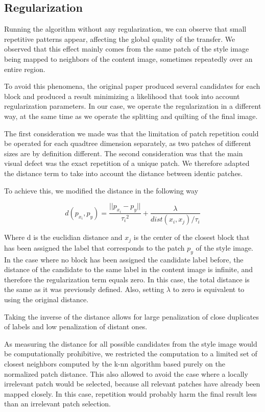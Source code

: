\documentclass[a4paper]{article}
\begin{document}
\subsection{Regularization}

Running the algorithm without any regularization, we can observe that small repetitive patterns appear, affecting the global quality of the transfer. We observed that this effect mainly comes from the same patch of the style image being mapped to neighbors of the content image, sometimes repeatedly over an entire region.

To avoid this phenomena, the original paper produced several candidates for each block and produced a result minimizing a likelihood that took into account regularization parameters. In our case, we operate the regularization in a different way, at the same time as we operate the splitting and quilting of the final image.

The first consideration we made was that the limitation of patch repetition could be operated for each quadtree dimension separately, as two patches of different sizes are by definition different. The second consideration was that the main visual defect was the exact repetition of a unique patch. We therefore adapted the distance term to take into account the distance between identic patches.

To achieve this, we modified the distance in the following way 
   
\[d(p_{x_i}, p_{y}) = \frac{||p_{x_i}-p_y||}{{\tau_i}^2} + \frac{\lambda}{dist(x_i,x_j)/\tau_i} \] 

Where d is the euclidian distance and $x_j$ is the center of the closest block that has been assigned the label that corresponds to the patch $p_y$ of the style image. In the case where no block has been assigned the candidate label before, the distance of the candidate to the same label in the content image is infinite, and therefore the regularization term equals zero. In this case, the total distance is the same as it was previously defined. Also, setting $\lambda$ to zero is equivalent to using the original distance.

Taking the inverse of the distance allows for large penalization of close duplicates of labels and low penalization of distant ones. 

As measuring the distance for all possible candidates from the style image would be computationally prohibitive, we restricted the computation to a limited set of closest neighbors computed by the k-nn algorithm based purely on the normalized patch distance. This also allowed to avoid the case where a locally irrelevant patch would be selected, because all relevant patches have already been mapped closely. In this case, repetition would probably harm the final result less than an irrelevant patch selection.
\end{document}
